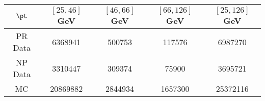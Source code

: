 \begin{tabular}{c||c|c|c||c}
 $\pt$ & $[25, 46]$ GeV & $[46, 66]$ GeV & $[66, 126]$ GeV & $[25, 126]$ GeV \\
\hline
PR Data & 6368941 & 500753 & 117576 & 6987270 \\
NP Data & 3310447 & 309374 & 75900 & 3695721 \\
MC & 20869882 & 2844934 & 1657300 & 25372116 \\
\end{tabular}
